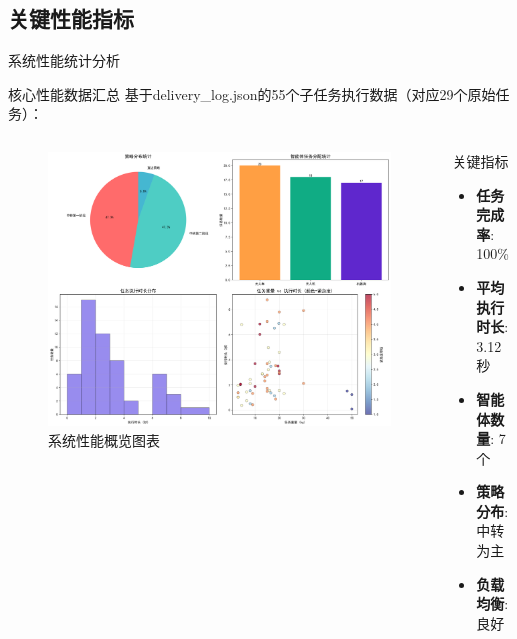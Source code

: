 \documentclass[
10pt,
aspectratio=169,
]{beamer}
\begin{document}
\subsection{关键性能指标}

\begin{frame}{系统性能统计分析}
    \begin{block}{核心性能数据汇总}
        基于delivery\_log.json的55个子任务执行数据（对应29个原始任务）：
    \end{block}
    
    \begin{columns}
        \begin{column}{0.6\textwidth}
            \begin{figure}[htbp]
                \centering
                \includegraphics[width=\textwidth]{analysis_results/system_performance_overview_20250616_092657.png}
                \caption{系统性能概览图表}
            \end{figure}
        \end{column}
        \begin{column}{0.4\textwidth}
            \begin{exampleblock}{关键指标}
                \begin{itemize}
                    \item \textbf{任务完成率}: 100\%
                    \item \textbf{平均执行时长}: 3.12秒
                    \item \textbf{智能体数量}: 7个
                    \item \textbf{策略分布}: 中转为主
                    \item \textbf{负载均衡}: 良好
                \end{itemize}
            \end{exampleblock}
            

\end{column}
\end{columns}
\end{frame}
\end{document}
